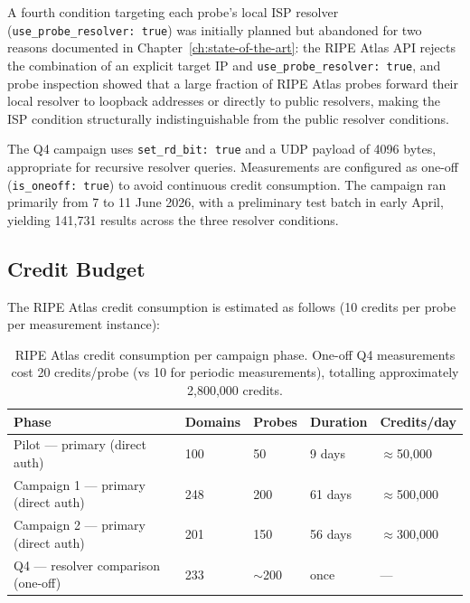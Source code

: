 A fourth condition targeting each probe's local \ac{ISP} resolver (\texttt{use\_probe\_resolver: true}) was initially planned but abandoned for two reasons documented in Chapter~\ref{ch:state-of-the-art}: the RIPE Atlas \ac{API} rejects the combination of an explicit target \ac{IP} and \texttt{use\_probe\_resolver: true}, and probe inspection showed that a large fraction of RIPE Atlas probes forward their local resolver to loopback addresses or directly to public resolvers, making the \ac{ISP} condition structurally indistinguishable from the public resolver conditions.

The Q4 campaign uses \texttt{set\_rd\_bit: true} and a \ac{UDP} payload of 4096 bytes, appropriate for recursive resolver queries. Measurements are configured as one-off (\texttt{is\_oneoff: true}) to avoid continuous credit consumption. The campaign ran primarily from 7 to 11 June 2026, with a preliminary test batch in early April, yielding 141,731 results across the three resolver conditions.

\subsection{Credit Budget}
\label{subsec:3.3.4}

The RIPE Atlas credit consumption is estimated as follows (10 credits per probe per measurement instance):

\begin{table}[H]
\centering
\small
\begin{tabular}{l l l l l}
\toprule
\textbf{Phase} & \textbf{Domains} & \textbf{Probes} & \textbf{Duration} & \textbf{Credits/day} \\
\midrule
Pilot — primary (direct auth)            & 100 &  50 &  9 days  & $\approx$50,000 \\
Campaign 1 — primary (direct auth)       & 248 & 200 & 61 days  & $\approx$500,000 \\
Campaign 2 — primary (direct auth)       & 201 & 150 & 56 days  & $\approx$300,000 \\
Q4 — resolver comparison (one-off)       & 233 & $\sim$200 & once     & --- \\
\bottomrule
\end{tabular}
\caption{RIPE Atlas credit consumption per campaign phase. One-off Q4 measurements cost 20 credits/probe (vs 10 for periodic measurements), totalling approximately 2,800,000 credits.}
\label{tab:credit_budget}
\end{table}

